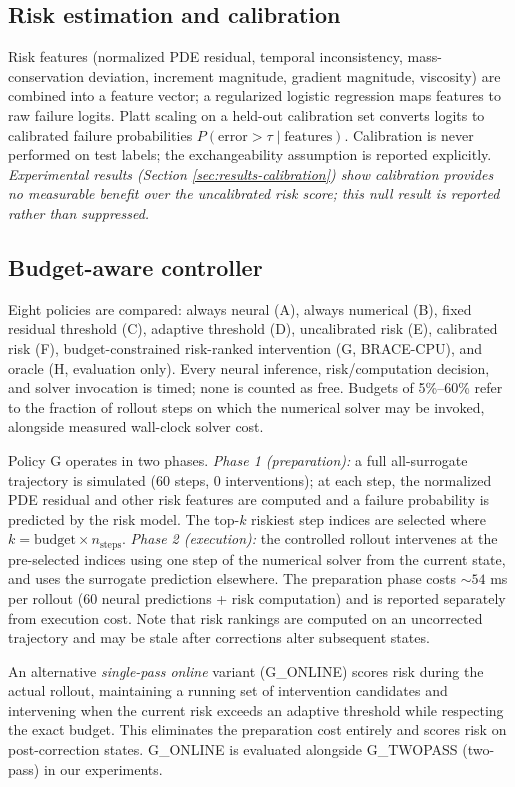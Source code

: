 \documentclass[11pt]{article}
\begin{document}
\subsection{Risk estimation and calibration}
Risk features (normalized PDE residual, temporal inconsistency, mass-conservation deviation, increment magnitude, gradient magnitude, viscosity) are combined into a feature vector; a regularized logistic regression maps features to raw failure logits. Platt scaling on a held-out calibration set converts logits to calibrated failure probabilities $P(\text{error}>\tau \mid \text{features})$. Calibration is never performed on test labels; the exchangeability assumption is reported explicitly. \emph{Experimental results (Section \ref{sec:results-calibration}) show calibration provides no measurable benefit over the uncalibrated risk score; this null result is reported rather than suppressed.}

\subsection{Budget-aware controller}
Eight policies are compared: always neural (A), always numerical (B), fixed residual threshold (C), adaptive threshold (D), uncalibrated risk (E), calibrated risk (F), budget-constrained risk-ranked intervention (G, BRACE-CPU), and oracle (H, evaluation only). Every neural inference, risk/computation decision, and solver invocation is timed; none is counted as free. Budgets of 5\%--60\% refer to the fraction of rollout steps on which the numerical solver may be invoked, alongside measured wall-clock solver cost.

Policy G operates in two phases. \emph{Phase 1 (preparation):} a full all-surrogate trajectory is simulated (60 steps, 0 interventions); at each step, the normalized PDE residual and other risk features are computed and a failure probability is predicted by the risk model. The top-$k$ riskiest step indices are selected where $k=\text{budget}\times n_\text{steps}$. \emph{Phase 2 (execution):} the controlled rollout intervenes at the pre-selected indices using one step of the numerical solver from the current state, and uses the surrogate prediction elsewhere. The preparation phase costs $\sim 54$ ms per rollout (60 neural predictions + risk computation) and is reported separately from execution cost. Note that risk rankings are computed on an uncorrected trajectory and may be stale after corrections alter subsequent states.

An alternative \emph{single-pass online} variant (G\_ONLINE) scores risk during the actual rollout, maintaining a running set of intervention candidates and intervening when the current risk exceeds an adaptive threshold while respecting the exact budget. This eliminates the preparation cost entirely and scores risk on post-correction states. G\_ONLINE is evaluated alongside G\_TWOPASS (two-pass) in our experiments.
\end{document}

